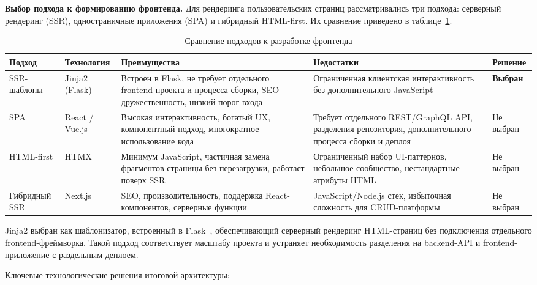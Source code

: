 \textbf{Выбор подхода к формированию фронтенда.} Для рендеринга пользовательских
страниц рассматривались три подхода: серверный рендеринг (SSR), одностраничные
приложения (SPA) и гибридный HTML-first. Их сравнение приведено в таблице~\ref{tab:frontend}.

\begin{table}[ht!]
    \centering
    \caption{Сравнение подходов к разработке фронтенда}
    \label{tab:frontend}
    \small
    \begin{tabularx}{\textwidth}{|p{2.5cm}|p{2.3cm}|X|X|p{2.2cm}|}
        \hline
        \textbf{Подход} & \textbf{Технология} & \textbf{Преимущества} & \textbf{Недостатки} & \textbf{Решение} \\ \hline
        SSR-шаблоны &
        Jinja2 (Flask) &
        Встроен в Flask, не требует отдельного frontend-проекта и процесса сборки, SEO-дружественность, низкий порог входа &
        Ограниченная клиентская интерактивность без дополнительного JavaScript &
        \textbf{Выбран} \\ \hline
        SPA &
        React / Vue.js &
        Высокая интерактивность, богатый UX, компонентный подход, многократное использование кода &
        Требует отдельного REST/GraphQL API, разделения репозитория, дополнительного процесса сборки и деплоя &
        Не выбран \\ \hline
        HTML-first &
        HTMX &
        Минимум JavaScript, частичная замена фрагментов страницы без перезагрузки, работает поверх SSR &
        Ограниченный набор UI-паттернов, небольшое сообщество, нестандартные атрибуты HTML &
        Не выбран \\ \hline
        Гибридный SSR &
        Next.js &
        SEO, производительность, поддержка React-компонентов, серверные функции &
        JavaScript/Node.js стек, избыточная сложность для CRUD-платформы &
        Не выбран \\ \hline
    \end{tabularx}
\end{table}

Jinja2 выбран как шаблонизатор, встроенный в Flask~\cite{flask_docs}, обеспечивающий
серверный рендеринг HTML-страниц без подключения отдельного frontend-фреймворка. Такой подход соответствует
масштабу проекта и устраняет необходимость разделения на backend-API и
frontend-приложение с раздельным деплоем.

Ключевые технологические решения итоговой архитектуры:

